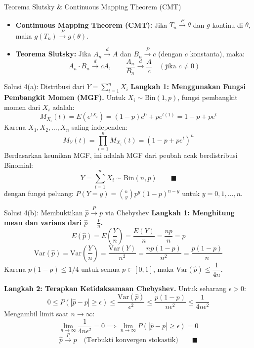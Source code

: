 \documentclass[10pt,twoside]{article}
\begin{document}
\begin{tipbox}{Teorema Slutsky \& Continuous Mapping Theorem (CMT)}
\begin{itemize}
  \item \textbf{Continuous Mapping Theorem (CMT):} Jika $T_n \xrightarrow{P} \theta$ dan $g$ kontinu di $\theta$, maka $g(T_n) \xrightarrow{P} g(\theta)$.
  \item \textbf{Teorema Slutsky:} Jika $A_n \xrightarrow{d} A$ dan $B_n \xrightarrow{P} c$ (dengan $c$ konstanta), maka:
  \[
  A_n \cdot B_n \xrightarrow{d} c A, \qquad \frac{A_n}{B_n} \xrightarrow{d} \frac{A}{c} \quad (\text{jika } c \ne 0)
  \]
\end{itemize}
\end{tipbox}

\begin{solbox}{Solusi 4(a): Distribusi dari $Y = \sum_{i=1}^n X_i$}
\textbf{Langkah 1: Menggunakan Fungsi Pembangkit Momen (MGF).}
Untuk $X_i \sim \text{Bin}(1, p)$, fungsi pembangkit momen dari $X_i$ adalah:
\[
M_{X_i}(t) = E(e^{tX_i}) = (1 - p)e^{0} + p e^{t(1)} = 1 - p + p e^t
\]
Karena $X_1, X_2, \dots, X_n$ saling independen:
\[
M_Y(t) = \prod_{i=1}^n M_{X_i}(t) = (1 - p + p e^t)^n
\]
Berdasarkan keunikan MGF, ini adalah MGF dari peubah acak berdistribusi Binomial:
\[
\boxed{Y = \sum_{i=1}^n X_i \sim \text{Bin}(n, p)} \qquad \blacksquare
\]
dengan fungsi peluang: $P(Y = y) = \binom{n}{y} p^y (1-p)^{n-y}$ untuk $y = 0, 1, \dots, n$.
\end{solbox}

\begin{solbox}{Solusi 4(b): Membuktikan $\hat{p} \xrightarrow{P} p$ via Chebyshev}
\textbf{Langkah 1: Menghitung mean dan varians dari $\hat{p} = \frac{Y}{n}$.}
\[
E(\hat{p}) = E\left(\frac{Y}{n}\right) = \frac{E(Y)}{n} = \frac{np}{n} = p
\]
\[
\mathrm{Var}(\hat{p}) = \mathrm{Var}\left(\frac{Y}{n}\right) = \frac{\mathrm{Var}(Y)}{n^2} = \frac{np(1-p)}{n^2} = \frac{p(1-p)}{n}
\]
Karena $p(1-p) \le 1/4$ untuk semua $p \in [0, 1]$, maka $\mathrm{Var}(\hat{p}) \le \dfrac{1}{4n}$.

\textbf{Langkah 2: Terapkan Ketidaksamaan Chebyshev.}
Untuk sebarang $\epsilon > 0$:
\[
0 \le P(|\hat{p} - p| \ge \epsilon) \le \frac{\mathrm{Var}(\hat{p})}{\epsilon^2} \le \frac{p(1-p)}{n \epsilon^2} \le \frac{1}{4n \epsilon^2}
\]
Mengambil limit saat $n \to \infty$:
\[
\lim_{n \to \infty} \frac{1}{4n \epsilon^2} = 0 \implies \lim_{n \to \infty} P(|\hat{p} - p| \ge \epsilon) = 0
\]
\[
\boxed{\hat{p} \xrightarrow{P} p \quad \text{(Terbukti konvergen stokastik)}} \qquad \blacksquare
\]
\end{solbox}
\end{document}
